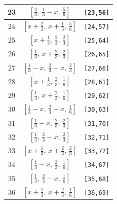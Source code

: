 \documentclass[fleqn,8pt]{jsarticle}
\begin{document}
\begin{longtable}{ccc}
23 & $\left[ \frac{2}{3},\, \frac{1}{3} - x,\, \frac{5}{6} \right]$ & {\tt [23,56]} \\ \hline
24 & $\left[ x + \frac{2}{3},\, x + \frac{1}{3},\, \frac{5}{6} \right]$ & {\tt [24,57]} \\ \hline
25 & $\left[ x + \frac{1}{3},\, \frac{2}{3},\, \frac{2}{3} \right]$ & {\tt [25,64]} \\ \hline
26 & $\left[ \frac{1}{3},\, x + \frac{2}{3},\, \frac{2}{3} \right]$ & {\tt [26,65]} \\ \hline
27 & $\left[ \frac{1}{3} - x,\, \frac{2}{3} - x,\, \frac{2}{3} \right]$ & {\tt [27,66]} \\ \hline
28 & $\left[ x + \frac{1}{3},\, \frac{2}{3},\, \frac{1}{6} \right]$ & {\tt [28,61]} \\ \hline
29 & $\left[ \frac{1}{3},\, x + \frac{2}{3},\, \frac{1}{6} \right]$ & {\tt [29,62]} \\ \hline
30 & $\left[ \frac{1}{3} - x,\, \frac{2}{3} - x,\, \frac{1}{6} \right]$ & {\tt [30,63]} \\ \hline
31 & $\left[ \frac{1}{3} - x,\, \frac{2}{3},\, \frac{2}{3} \right]$ & {\tt [31,70]} \\ \hline
32 & $\left[ \frac{1}{3},\, \frac{2}{3} - x,\, \frac{2}{3} \right]$ & {\tt [32,71]} \\ \hline
33 & $\left[ x + \frac{1}{3},\, x + \frac{2}{3},\, \frac{2}{3} \right]$ & {\tt [33,72]} \\ \hline
34 & $\left[ \frac{1}{3} - x,\, \frac{2}{3},\, \frac{1}{6} \right]$ & {\tt [34,67]} \\ \hline
35 & $\left[ \frac{1}{3},\, \frac{2}{3} - x,\, \frac{1}{6} \right]$ & {\tt [35,68]} \\ \hline
36 & $\left[ x + \frac{1}{3},\, x + \frac{2}{3},\, \frac{1}{6} \right]$ & {\tt [36,69]} \\
\end{longtable}
\renewcommand{\arraystretch}{1.2}
\end{document}
